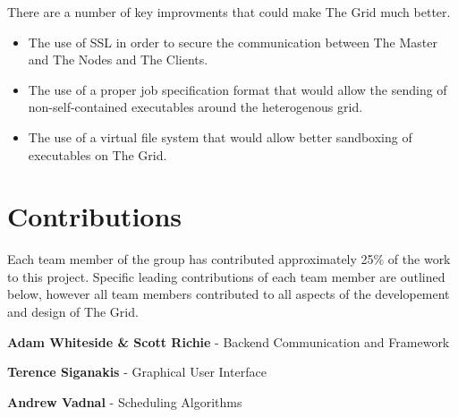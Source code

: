 There are a number of key improvments that could make The Grid much better.

\begin{itemize}
\item The use of SSL in order to secure the communication between The Master and The Nodes and The Clients.

\item The use of a proper job specification format that would allow the sending of non-self-contained executables around the heterogenous grid.

\item The use of a virtual file system that would allow better sandboxing of executables on The Grid.

\end{itemize}

 \clearpage \chapter{Contributions}
\label{contributions}

Each team member of the group has contributed approximately 25\% of the work to this project. Specific leading contributions of each team member are outlined below, however all team members contributed to all aspects of the developement and design of The Grid. 

\textbf{Adam Whiteside \& Scott Richie} - Backend Communication and Framework

\textbf{Terence Siganakis} - Graphical User Interface

\textbf{Andrew Vadnal} - Scheduling Algorithms




